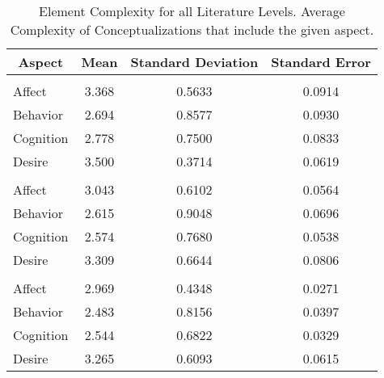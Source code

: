\begin{table}
\begin{minipage}[t][\textheight][t]{\textwidth}

\caption{\label{tab:CombinedElementComplexity}Element Complexity for all Literature Levels. Average Complexity of Conceptualizations that include the given aspect.}
\begin{tabular}[t]{lccc}
\toprule
\multicolumn{1}{c}{Aspect} & Mean & Standard Deviation & Standard Error\\
\midrule
\addlinespace[0.3em]
\multicolumn{4}{l}{\textbf{Theoretical}}\\
\hspace{1em}Affect & 3.368 & 0.5633 & 0.0914\\
\hspace{1em}Behavior & 2.694 & 0.8577 & 0.0930\\
\hspace{1em}Cognition & 2.778 & 0.7500 & 0.0833\\
\hspace{1em}Desire & 3.500 & 0.3714 & 0.0619\\
\addlinespace[0.3em]
\multicolumn{4}{l}{\textbf{Methdological}}\\
\hspace{1em}Affect & 3.043 & 0.6102 & 0.0564\\
\hspace{1em}Behavior & 2.615 & 0.9048 & 0.0696\\
\hspace{1em}Cognition & 2.574 & 0.7680 & 0.0538\\
\hspace{1em}Desire & 3.309 & 0.6644 & 0.0806\\
\addlinespace[0.3em]
\multicolumn{4}{l}{\textbf{Empirical}}\\
\hspace{1em}Affect & 2.969 & 0.4348 & 0.0271\\
\hspace{1em}Behavior & 2.483 & 0.8156 & 0.0397\\
\hspace{1em}Cognition & 2.544 & 0.6822 & 0.0329\\
\hspace{1em}Desire & 3.265 & 0.6093 & 0.0615\\
\bottomrule
\end{tabular}
\end{minipage}
\end{table}
